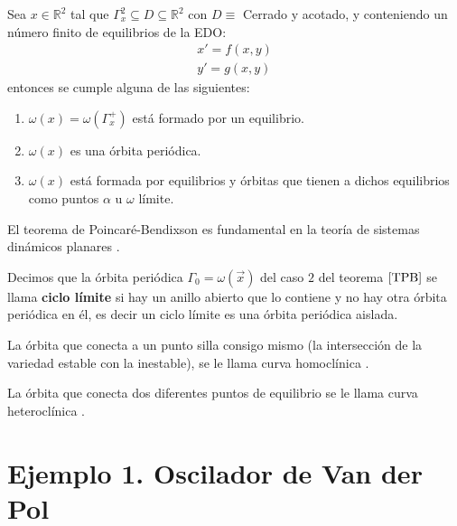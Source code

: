 \begin{theorem}\label{TPB}
	Sea $x\in\mathbb{R}^2$ tal que $\varGamma_{x}^2\subseteq D\subseteq\mathbb{R}^2$ con $D\equiv$ Cerrado y acotado,
	y conteniendo un número finito de equilibrios de la EDO:
	\begin{equation}
		\begin{matrix}
			x' = f(x,y) \\
			y' = g(x,y)
		\end{matrix}
	\end{equation}
	entonces se cumple alguna de las siguientes:
	\begin{enumerate}
		\item $\omega(x)=\omega(\varGamma_{x}^+)$ está formado por un equilibrio.
		\item $\omega(x)$ es una órbita periódica.
		\item $\omega(x)$ está formada por equilibrios y órbitas que tienen a dichos equilibrios como puntos
		      $\alpha$ u $\omega$ límite.
	\end{enumerate}
\end{theorem}

El teorema de Poincaré-Bendixson es fundamental en la teoría de sistemas dinámicos planares \cite{poincare1881memoire,bendixson1901courbes}.

\begin{definition}
	Decimos que la órbita periódica $\varGamma_0=\omega(\vec{x})$
	del caso $2$ del teorema $\ref{TPB}$ se llama
	\textbf{ciclo límite} si hay un anillo abierto que lo
	contiene y no hay otra órbita periódica en él, es decir
	un ciclo límite es una órbita periódica aislada.
\end{definition}

\begin{definition}
	La órbita que conecta a un punto silla consigo mismo (la intersección de la variedad estable con la inestable), se le llama curva homoclínica \cite{kuznetsov2013elements}.
\end{definition}

\begin{definition}
	La órbita que conecta dos diferentes puntos de equilibrio se le llama curva heteroclínica \cite{kuznetsov2013elements}.
\end{definition}

\section{Ejemplo 1. Oscilador de Van der Pol}

